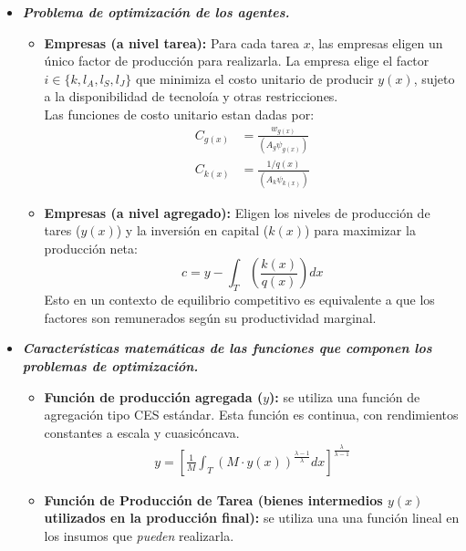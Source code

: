 \documentclass{article}
\theoremstyle{remark}
\theoremstyle{definition}
\begin{document}
\begin{enumerate}
\begin{tcolorbox}[title= Soluci\'on 3]
\begin{itemize}
                \item {\textbf{\textit{Problema de optimizaci\'on de los agentes.}}} 
                    \begin{itemize}
                        \item \textbf{Empresas (a nivel tarea):} Para cada tarea $x$, las empresas eligen un \'unico factor de producci\'on para realizarla. La empresa elige el factor $i \in \{k,l_A,l_S,l_J\}$ que minimiza el costo unitario de producir $y(x)$, sujeto a la disponibilidad de tecnolo\'ia y otras restricciones. \\
                        Las funciones de costo unitario estan dadas por:
                        \begin{align*}
                            C_{g(x)} &= \frac{w_{g(x)}}{(A_g\psi_{g(x)})} \\
                            C_{k(x)} &= \frac{1/q(x)}{(A_k\psi_{k(x)})}
                        \end{align*}
                        \item \textbf{Empresas (a nivel agregado):} Eligen los niveles de producci\'on de tares ($y(x)$) y la inversi\'on en capital ($k(x)$) para maximizar la producci\'on neta: 
                        $$c=y-\int_T\left(\frac{k(x)}{q(x)}\right)dx$$ 
                        Esto en un contexto de equilibrio competitivo es equivalente a que los factores son remunerados seg\'un su productividad marginal.
                    \end{itemize}
                \item {\textbf{\textit{Caracter\'isticas matemáticas de las funciones que componen los problemas de optimizaci\'on.}}}
                    \begin{itemize}
                        \item \textbf{Funci\'on de producci\'on agregada ($y$):} se utiliza una funci\'on de agregaci\'on tipo CES est\'andar. Esta funci\'on es continua, con rendimientos constantes a escala y cuasic\'oncava.
                            \begin{align*}
                                y=\left[\frac{1}{M}\int_T\left(M\cdot y(x)\right)^{\frac{\lambda-1}{\lambda}}dx\right]^{\frac{\lambda}{\lambda-1}}
                            \end{align*}
                        \item \textbf{Funci\'on de Producci\'on de Tarea (bienes intermedios $y(x)$ utilizados en la producci\'on final):} se utiliza una una funci\'on lineal en los insumos que \emph{pueden} realizarla.

\end{itemize}
\end{itemize}
\end{tcolorbox}
\end{enumerate}
\end{document}
